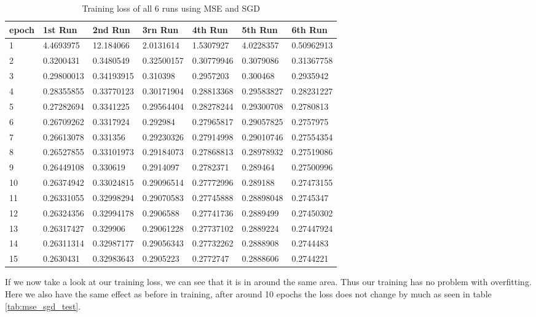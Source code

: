 \begin{table}[!ht]
    \centering
    \begin{tabular}{|l||l||l||l||l||l||l|}
    \hline
        epoch & 1st Run & 2nd Run & 3rn Run & 4th Run & 5th Run & 6th Run \\ \hline
        1 & 4.4693975 & 12.184066 & 2.0131614 & 1.5307927 & 4.0228357 & 0.50962913 \\ \hline
        2 & 0.3200431 & 0.3480549 & 0.32500157 & 0.30779946 & 0.3079086 & 0.31367758 \\ \hline
        3 & 0.29800013 & 0.34193915 & 0.310398 & 0.2957203 & 0.300468 & 0.2935942 \\ \hline
        4 & 0.28355855 & 0.33770123 & 0.30171904 & 0.28813368 & 0.29583827 & 0.28231227 \\ \hline
        5 & 0.27282694 & 0.3341225 & 0.29564404 & 0.28278244 & 0.29300708 & 0.2780813 \\ \hline
        6 & 0.26709262 & 0.3317924 & 0.292984 & 0.27965817 & 0.29057825 & 0.2757975 \\ \hline
        7 & 0.26613078 & 0.331356 & 0.29230326 & 0.27914998 & 0.29010746 & 0.27554354 \\ \hline
        8 & 0.26527855 & 0.33101973 & 0.29184073 & 0.27868813 & 0.28978932 & 0.27519086 \\ \hline
        9 & 0.26449108 & 0.330619 & 0.2914097 & 0.2782371 & 0.289464 & 0.27500996 \\ \hline
        10 & 0.26374942 & 0.33024815 & 0.29096514 & 0.27772996 & 0.289188 & 0.27473155 \\ \hline
        11 & 0.26331055 & 0.32998294 & 0.29070583 & 0.27745888 & 0.28898048 & 0.2745347 \\ \hline
        12 & 0.26324356 & 0.32994178 & 0.2906588 & 0.27741736 & 0.2889499 & 0.27450302 \\ \hline
        13 & 0.26317427 & 0.329906 & 0.29061228 & 0.27737102 & 0.2889224 & 0.27447924 \\ \hline
        14 & 0.26311314 & 0.32987177 & 0.29056343 & 0.27732262 & 0.2888908 & 0.2744483 \\ \hline
        15 & 0.2630431 & 0.32983643 & 0.2905223 & 0.2772747 & 0.2888606 & 0.2744221 \\ \hline
    \end{tabular}
    \caption{\label{tab:mse_sgd_train}Training loss of all 6 runs using MSE and SGD}
\end{table}

If we now take a look at our training loss, we can see that it is in around the same area. Thus our training
has no problem with overfitting. Here we also have the same effect as before in training, after around 10 epochs
the loss does not change by much as seen in table \ref{tab:mse_sgd_test}.


